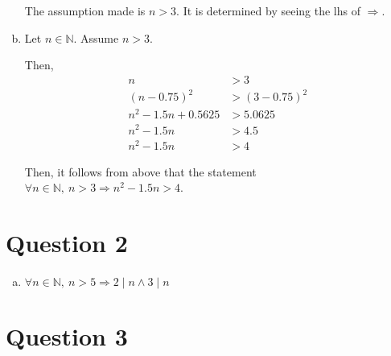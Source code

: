 \documentclass[12pt]{article}
\begin{document}
\begin{enumerate}[a.]
    The assumption made is $n > 3$. It is determined by seeing the lhs of
    $\Rightarrow$.

    \item

    Let $n \in \mathbb{N}$. Assume $n > 3$.

    \bigskip

    Then,
    \setcounter{equation}{0}
    \begin{align}
        n &> 3\\
        (n - 0.75)^2 &> (3 - 0.75)^2\\
        n^2 - 1.5n + 0.5625 &> 5.0625\\
        n^2 - 1.5n &> 4.5\\
        n^2 - 1.5n &> 4
    \end{align}

    \bigskip

    Then, it follows from above that the statement $\forall n \in \mathbb{N},\:
    n > 3 \Rightarrow n^2 - 1.5n > 4$.

\end{enumerate}

\section*{Question 2}
\begin{enumerate}[a.]
    \item

    $\forall n \in \mathbb{N},\:n > 5 \Rightarrow 2 \mid n \land 3 \mid n$
\end{enumerate}

\section*{Question 3}
\end{document}

